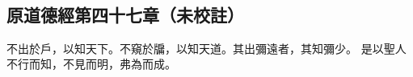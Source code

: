 ﻿%
%

\chapter{~}

\section{原道德經第四十七章（未校註）}

\begin{withgezhu}

\zhsong


不出於戶，以知天下。不窺於牖，以知天道。其出彌遠者，其知彌少。
是以聖人不行而知，不見而明，弗為而成。

\end{withgezhu}
